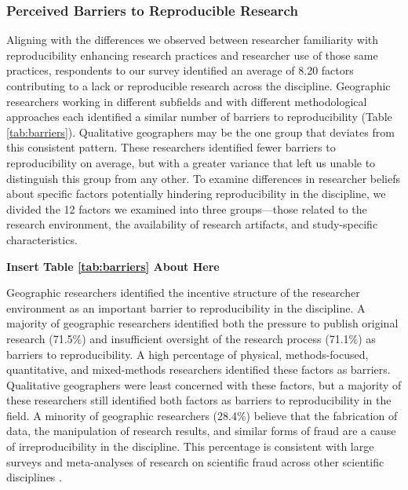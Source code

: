 \documentclass[]{interact}
\theoremstyle{plain}%
\theoremstyle{definition}
\theoremstyle{remark}
\begin{document}
\subsubsection*{Perceived Barriers to Reproducible Research}
Aligning with the differences we observed between researcher familiarity with reproducibility enhancing research practices and researcher use of those same practices, respondents to our survey identified an average of 8.20 factors contributing to a lack or reproducible research across the discipline. 
Geographic researchers working in different subfields and with different methodological approaches each identified a similar number of barriers to reproducibility (Table \ref{tab:barriers}).
Qualitative geographers may be the one group that deviates from this consistent pattern. 
These researchers identified fewer barriers to reproducibility on average, but with a greater variance that left us unable to distinguish this group from any other.
To examine differences in researcher beliefs about specific factors potentially hindering reproducibility in the discipline, we divided the 12 factors we examined into three groups---those related to the research environment, the availability of research artifacts, and study-specific characteristics. 

\begin{center}
\textbf{Insert Table \ref{tab:barriers} About Here}
\end{center}

Geographic researchers identified the incentive structure of the researcher environment as an important barrier to reproducibility in the discipline.
A majority of geographic researchers identified both the pressure to publish original research (71.5\%) and insufficient oversight of the research process (71.1\%) as barriers to reproducibility.
A high percentage of physical, methods-focused, quantitative, and mixed-methods researchers identified these factors as barriers. 
Qualitative geographers were least concerned with these factors, but a majority of these researchers still identified both factors as barriers to reproducibility in the field.
A minority of geographic researchers (28.4\%) believe that the fabrication of data, the manipulation of research results, and similar forms of fraud are a cause of irreproducibility in the discipline.
This percentage is consistent with large surveys and meta-analyses of research on scientific fraud across other scientific disciplines \citep{fanelli2009many, baker20161}.
\end{document}
